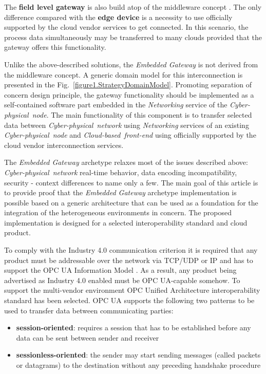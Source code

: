 \documentclass[runningheads]{llncs}
\begin{document}
The \textbf{field level gateway} is also build atop of the middleware concept \cite{Sunyaev2020}. The only difference compared with the \textbf{edge device} is a necessity to use officially supported by the cloud vendor services to get connected. In this scenario, the process data simultaneously may be transferred to many clouds provided that the gateway offers this functionality.

Unlike the above-described solutions, the \emph{Embedded Gateway} is not derived from the middleware concept. A generic domain model for this interconnection is presented in the Fig.~\ref{figure1.StrategyDomainModel}. Promoting separation of concern design principle, the gateway functionality should be implemented as a self-contained software part embedded in the \emph{Networking} service of the \emph{Cyber-physical\ node}. The main functionality of this component is to transfer selected data between \emph{Cyber-physical\ network} using \emph{Networking} services of an existing \emph{Cyber-physical\ node} and \emph{Cloud-based\ front-end} using officially supported by the cloud vendor interconnection services.

The \emph{Embedded Gateway} archetype relaxes most of the issues described above: \emph{Cyber-physical\ network} real-time behavior, data encoding incompatibility, security - context differences to name only a few. The main goal of this article is to provide proof that the \emph{Embedded Gateway} archetype implementation is possible based on a generic architecture that can be used as a foundation for the integration of the heterogeneous environments in concern. The proposed implementation is designed for a selected interoperability standard and cloud product.

To comply with the Industry 4.0 communication criterion it is required that any product must be addressable over the network via TCP/UDP \cite{RefWorks:doc:5d8e1874e4b0bc72a68f0d11} or IP \cite{RefWorks:doc:5ac86c98e4b009947bbb8730} and has to support the OPC UA Information Model \cite{OPCUAPart5, RefWorks:doc:5ac86c99e4b009947bbb87c9, RefWorks:doc:5d986a28e4b0b0c862c0d184}. As a result, any product being advertised as Industry 4.0 enabled must be OPC UA-capable somehow. To support the multi-vendor environment OPC Unified Architecture interoperability standard has been selected. OPC UA supports the following two patterns to be used to transfer data between communicating parties:

\begin{itemize}
      \item \textbf{session-oriented}: requires a session that has to be established before any data can be sent between sender and receiver
      \item \textbf{sessionless-oriented}: the sender may start sending messages (called packets or datagrams) to the destination without any preceding handshake procedure
\end{itemize}
\end{document}
